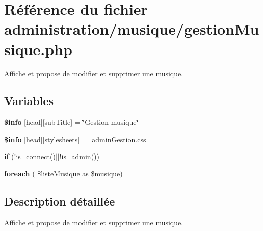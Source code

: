 \hypertarget{gestionMusique_8php}{}\section{Référence du fichier administration/musique/gestion\+Musique.php}
\label{gestionMusique_8php}


Affiche et propose de modifier et supprimer une musique.  


\subsection*{Variables}
\begin{DoxyCompactItemize}
\item 
\mbox{\label{gestionMusique_8php_a024f87f9bf4f3b33710e2e7ff8f60823}} 
{\bfseries \$info} \mbox{[}\textquotesingle{}head\textquotesingle{}\mbox{]}\mbox{[}\textquotesingle{}sub\+Title\textquotesingle{}\mbox{]} = \char`\"{}Gestion musique\char`\"{}
\item 
\mbox{\label{gestionMusique_8php_af6044c8bf78ebc8c58057e14d7738bbd}} 
{\bfseries \$info} \mbox{[}\textquotesingle{}head\textquotesingle{}\mbox{]}\mbox{[}\textquotesingle{}stylesheets\textquotesingle{}\mbox{]} = \mbox{[}\textquotesingle{}admin\+Gestion.\+css\textquotesingle{}\mbox{]}
\item 
\mbox{\label{gestionMusique_8php_af06578d46576ae68ff2e0780832fd8a0}} 
{\bfseries if} (!\hyperlink{fonctionCompte_8php_a2fe594e0482307b8729ea37780d6f74b}{is\+\_\+connect}()$\vert$$\vert$!\hyperlink{fonctionCompte_8php_a0b327581800dba50ad70720e23ae2ed2}{is\+\_\+admin}())
\item 
\mbox{\label{gestionMusique_8php_adf9bf5726cbdab4744679c2eb34b7ec0}} 
{\bfseries foreach} ( \$liste\+Musique as \$musique)
\end{DoxyCompactItemize}


\subsection{Description détaillée}
Affiche et propose de modifier et supprimer une musique. 

